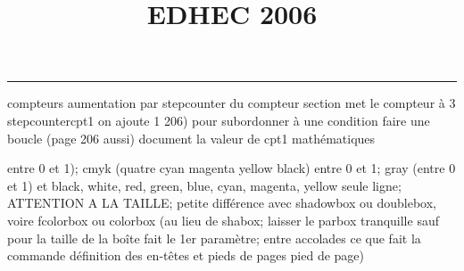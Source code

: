 \documentclass[11pt]{article}%
\title{\bf \vspace{-2cm} EDHEC 2006} %
\author{} %
\date{} %
\renewcommand{\headrulewidth}{0pt}%
\renewcommand{\footrulewidth}{0.4pt}%
\begin{document}
\maketitle %
\vspace{-1.4cm}\hrule %
\thispagestyle{fancy}

\vspace*{.2cm}



compteurs%
aumentation par stepcounter du compteur section%
met le compteur à 3%
stepcounter{cpt1} on ajoute 1%
206) pour subordonner à une condition %
faire une boucle (page 206 aussi) %
document la valeur de cpt1 
mathématiques\newcommand{\ch}{\operatorname{ch}} 
\newcommand{\sh}{\operatorname{sh}}
\renewcommand{\tanh}{\operatorname{th}}
\renewcommand{\sinh}{\operatorname{sh}}
\renewcommand{\cosh}{\operatorname{ch}}
\newcommand{\argsh}{\operatorname{argsh}}
\newcommand{\argch}{\operatorname{argch}}
\newcommand{\argth}{\operatorname{argth}}
\newcommand{\Id}{\operatorname{Id}}
\renewcommand{\leq}{\leq}
\renewcommand{\geq}{\geq }

\newcommand{\dlim}{\lim}
\newcommand{\dsum}{\sum}
\newcommand{\dprod}{\prod}



entre 0 et 1); cmyk (quatre cyan magenta yellow black) entre 0 et 1;
gray (entre 0 et 1) et black, white, red, green, blue, cyan, magenta,
yellow%
seule ligne; ATTENTION A LA TAILLE; petite différence avec shadowbox ou
doublebox, voire fcolorbox ou colorbox (au lieu de shabox; laisser le
parbox tranquille sauf pour la taille de la boîte
\newcommand{\Tbox}[1]{\begin{center} \shabox{\parbox{0.6
\linewidth}{#1}} \end{center}} %
fait le 1er paramètre; entre accolades ce que fait la commande
définition des en-têtes et pieds de pages\pagestyle{fancy}
\chead{}
\rfoot[ \ \thepage]{\thepage}
\cfoot{}
\lfoot{}
\thispagestyle{fancy} %
pied de page)\renewcommand{\footrulewidth}{0.4pt}
\renewcommand{\headrulewidth}{0.4pt}
\end{document}
